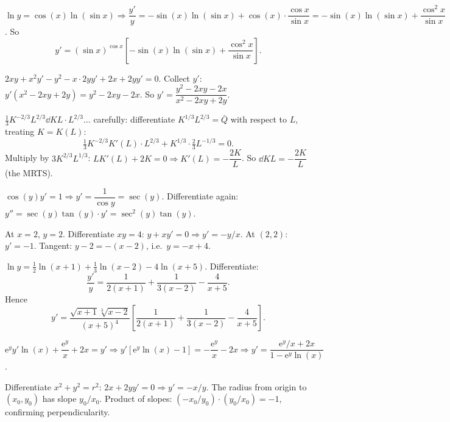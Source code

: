 \begin{solutions}
  \item $\ln y=\cos(x)\ln(\sin x)\Rightarrow\dfrac{y'}{y}
        =-\sin(x)\ln(\sin x)+\cos(x)\cdot\dfrac{\cos x}{\sin x}
        =-\sin(x)\ln(\sin x)+\dfrac{\cos^{2}x}{\sin x}$. So
        \[
          y'=(\sin x)^{\cos x}\left[-\sin(x)\ln(\sin x)
             +\frac{\cos^{2}x}{\sin x}\right] .
        \]

  \item $2xy+x^{2}y'-y^{2}-x\cdot 2yy'+2x+2yy'=0$. Collect $y'$:
        $y'(x^{2}-2xy+2y)=y^{2}-2xy-2x$. So
        $y'=\dfrac{y^{2}-2xy-2x}{x^{2}-2xy+2y}$.

  \item $\tfrac13K^{-2/3}L^{2/3}\dd{K}{L}\cdot L^{2/3}\ldots$
        carefully: differentiate $K^{1/3}L^{2/3}=\bar Q$ with respect to
        $L$, treating $K=K(L)$:
        \[
          \tfrac13K^{-2/3}K'(L)\cdot L^{2/3}+K^{1/3}\cdot\tfrac23L^{-1/3}=0 .
        \]
        Multiply by $3K^{2/3}L^{1/3}$: $LK'(L)+2K=0\Rightarrow
        K'(L)=-\dfrac{2K}{L}$. So $\dd{K}{L}=-\dfrac{2K}{L}$ (the MRTS).

  \item $\cos(y)y'=1\Rightarrow y'=\dfrac{1}{\cos y}=\sec(y)$.
        Differentiate again: $y''=\sec(y)\tan(y)\cdot y'
        =\sec^{2}(y)\tan(y)$.

  \item At $x=2$, $y=2$. Differentiate $xy=4$: $y+xy'=0\Rightarrow
        y'=-y/x$. At $(2,2)$: $y'=-1$. Tangent: $y-2=-(x-2)$, i.e.\
        $y=-x+4$.

  \item $\ln y=\tfrac12\ln(x+1)+\tfrac13\ln(x-2)-4\ln(x+5)$.
        Differentiate:
        \[
          \frac{y'}{y}=\frac{1}{2(x+1)}+\frac{1}{3(x-2)}-\frac{4}{x+5} .
        \]
        Hence
        \[
          y'=\frac{\sqrt{x+1}\sqrt[3]{x-2}}{(x+5)^{4}}
             \left[\frac{1}{2(x+1)}+\frac{1}{3(x-2)}-\frac{4}{x+5}\right] .
        \]

  \item $\mathrm{e}^{y}y'\ln(x)+\dfrac{\mathrm{e}^{y}}{x}+2x=y'\Rightarrow
        y'[\mathrm{e}^{y}\ln(x)-1]=-\dfrac{\mathrm{e}^{y}}{x}-2x\Rightarrow
        y'=\dfrac{\mathrm{e}^{y}/x+2x}{1-\mathrm{e}^{y}\ln(x)}$.

  \item Differentiate $x^{2}+y^{2}=r^{2}$: $2x+2yy'=0\Rightarrow
        y'=-x/y$. The radius from origin to $(x_{0},y_{0})$ has slope
        $y_{0}/x_{0}$. Product of slopes:
        $(-x_{0}/y_{0})\cdot(y_{0}/x_{0})=-1$, confirming
        perpendicularity.


\end{solutions}
